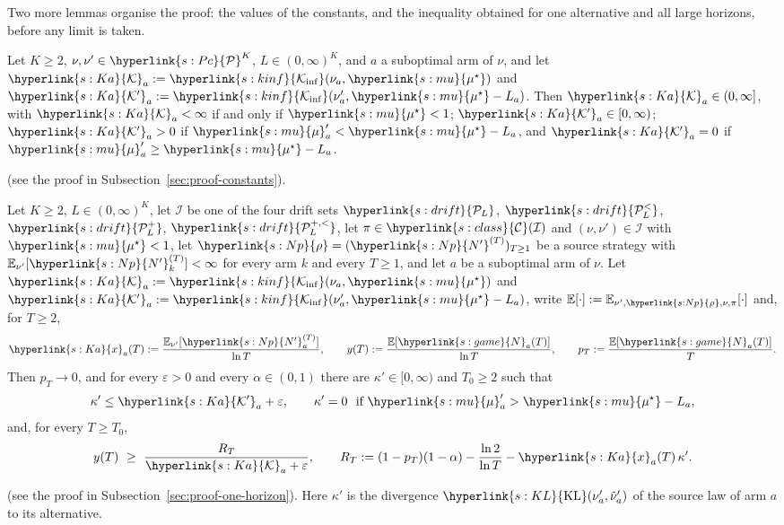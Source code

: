 \documentclass[11pt]{article}
\newcommand{\sy}[2]{\hyperlink{#1}{#2}}
\newcommand{\E}{\mathbb{E}}
\newcommand{\Pc}{\sy{s:Pc}{\mathcal{P}}}
\newcommand{\KL}{\sy{s:KL}{\mathrm{KL}}}
\newcommand{\Kinf}{\sy{s:kinf}{\mathcal{K}_{\inf}}}
\newcommand{\mean}{\sy{s:mu}{\mu}}
\newcommand{\ms}{\sy{s:mu}{\mu^{\star}}}
\newcommand{\Np}{\sy{s:Np}{N'}}
\newcommand{\rhos}{\sy{s:Np}{\rho}}
\newcommand{\Nc}{\sy{s:game}{N}}
\newcommand{\PcL}{\sy{s:drift}{\mathcal{P}_{L}}}
\newcommand{\PcLs}{\sy{s:drift}{\mathcal{P}^{<}_{L}}}
\newcommand{\PcLo}{\sy{s:drift}{\mathcal{P}^{+}_{L}}}
\newcommand{\PcLos}{\sy{s:drift}{\mathcal{P}^{+,<}_{L}}}
\newcommand{\Cl}{\sy{s:class}{\mathcal{C}}}
\newcommand{\Ka}{\sy{s:Ka}{\mathcal{K}}}
\newcommand{\Kp}{\sy{s:Ka}{\mathcal{K}'}}
\newcommand{\xr}{\sy{s:Ka}{x}}
\begin{document}
Two more lemmas organise the proof: the values of the constants, and the inequality obtained for
one alternative and all large horizons, before any limit is taken.

\begin{lemma}\label{lem:constants}
Let $K\ge2$, $\nu,\nu'\in\Pc^K$, $L\in(0,\infty)^K$, and $a$ a suboptimal arm of $\nu$, and let
$\Ka_a:=\Kinf(\nu_a,\ms)$ and $\Kp_a:=\Kinf(\nu'_a,\ms-L_a)$. Then $\Ka_a\in(0,\infty]$, with $\Ka_a<\infty$ if and only if $\ms<1$;
$\Kp_a\in[0,\infty)$; $\Kp_a>0$ if $\mean'_a<\ms-L_a$, and $\Kp_a=0$ if $\mean'_a\ge\ms-L_a$.
\end{lemma}
(see the proof in Subsection~\ref{sec:proof-constants}).

\begin{lemma}\label{lem:one-horizon}
Let $K\ge2$, $L\in(0,\infty)^K$, let $\mathcal I$ be one of the four drift sets $\PcL$, $\PcLs$,
$\PcLo$, $\PcLos$, let $\pi\in\Cl(\mathcal I)$ and $(\nu,\nu')\in\mathcal I$ with $\ms<1$, let
$\rhos=(\Np^{(T)})_{T\ge1}$ be a source strategy with $\E_{\nu'}[\Np^{(T)}_k]<\infty$ for every arm
$k$ and every $T\ge1$, and let $a$ be a suboptimal arm of $\nu$. Let $\Ka_a:=\Kinf(\nu_a,\ms)$ and
$\Kp_a:=\Kinf(\nu'_a,\ms-L_a)$, write $\E[\cdot]:=\E_{\nu',\rhos,\nu,\pi}[\cdot]$ and, for $T\ge2$,
\begin{equation*}
\xr_a(T):=\frac{\E_{\nu'}[\Np^{(T)}_a]}{\ln T},\qquad
y(T):=\frac{\E[\Nc_a(T)]}{\ln T},\qquad p_T:=\frac{\E[\Nc_a(T)]}{T}.
\end{equation*}
Then $p_T\to0$, and for every $\varepsilon>0$ and every $\alpha\in(0,1)$ there are $\kappa'\in[0,\infty)$
and $T_0\ge2$ such that
\begin{equation*}
\kappa'\le\Kp_a+\varepsilon,\qquad \kappa'=0\ \text{ if }\mean'_a>\ms-L_a,
\end{equation*}
and, for every $T\ge T_0$,
\begin{equation}\label{eq:one-horizon-2}
y(T)\ \ge\ \frac{R_T}{\Ka_a+\varepsilon},\qquad
R_T:=(1-p_T)(1-\alpha)-\frac{\ln2}{\ln T}-\xr_a(T)\,\kappa' .
\end{equation}
\end{lemma}
(see the proof in Subsection~\ref{sec:proof-one-horizon}). Here $\kappa'$ is the divergence
$\KL(\nu'_a,\tilde\nu'_a)$ of the source law of arm $a$ to its alternative.
\end{document}
